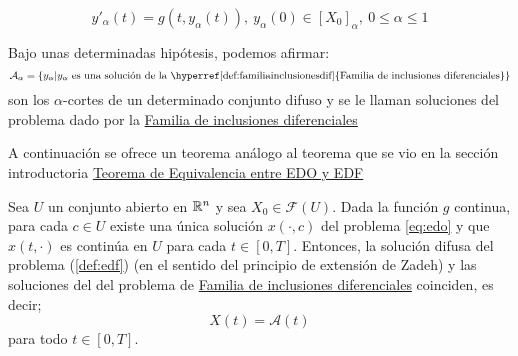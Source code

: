 \begin{equation}
	\label{def:familiainclusionesdif}
	y'_\alpha(t) = g(t, y_\alpha(t)), ~ y_\alpha(0) \in [X_0]_\alpha, ~ 0 \leq \alpha \leq 1
\end{equation}

Bajo unas determinadas hipótesis, podemos afirmar:
\[
	\mathcal{A}_\alpha = \{y_\alpha | y_\alpha ~ \text{es una solución de la \hyperref[def:familiainclusionesdif]{Familia de inclusiones diferenciales}}\}
\]
son los $\alpha$-cortes de un determinado conjunto difuso y se le llaman soluciones del problema dado por la \hyperref[def:familiainclusionesdif]{Familia de inclusiones diferenciales}

A continuación se ofrece un teorema análogo al teorema que se vio en la sección introductoria \hyperref[teorema:equivalencia]{Teorema de Equivalencia entre EDO y EDF}
\begin{teorema}
	Sea $U$ un conjunto abierto en $\mathbb R^n$ y sea $X_0 \in \mathcal{F}(U)$. Dada la función $g$ continua, para cada $c \in U$ existe una única solución $x(\cdot, c)$ del problema \ref{eq:edo} y que $x(t, \cdot)$ es continúa en $U$ para cada $t \in [0, T]$. Entonces, la solución difusa del problema (\ref{def:edf}) (en el sentido del principio de extensión de Zadeh) y las soluciones del del problema de \hyperref[def:familiainclusionesdif]{Familia de inclusiones diferenciales} coinciden, es decir;
	\[
		X(t) = \mathcal{A}(t)
	\]
	para todo $t \in [0, T]$.
\end{teorema}
